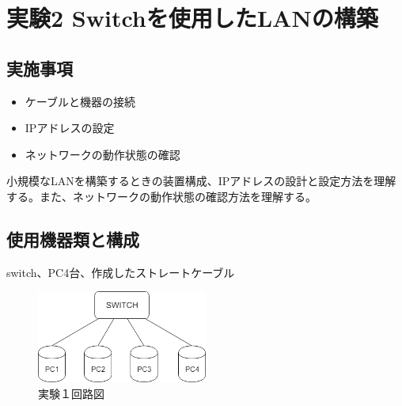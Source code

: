 \documentclass[10pt]{article}
\begin{document}
\section{実験2 Switchを使用したLANの構築}

\subsection{実施事項}
\begin{itemize}
    \item ケーブルと機器の接続 
    \item IPアドレスの設定
    \item ネットワークの動作状態の確認
\end{itemize}

小規模なLANを構築するときの装置構成、IPアドレスの設計と設定方法を理解する。また、ネットワークの動作状態の確認方法を理解する。

\subsection{使用機器類と構成}
switch、PC4台、作成したストレートケーブル 
\begin{figure}[H]
		\centering
		\includegraphics[width=0.5\textwidth]{networkExpreriment.png}
		\caption{実験１回路図}
	\end{figure}
\end{document}
